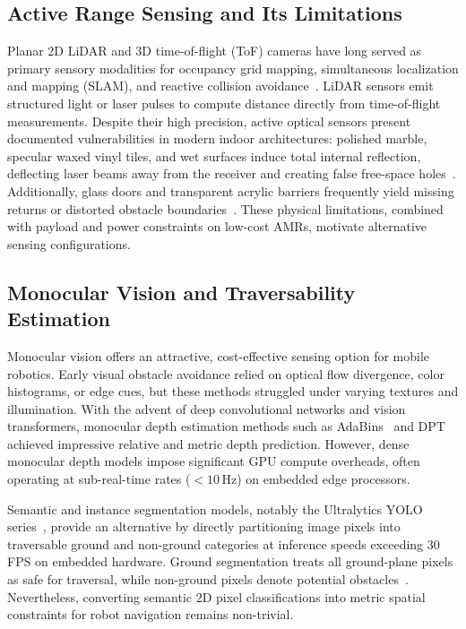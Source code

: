 \documentclass{ieeeaccess}
\begin{document}
\subsection{Active Range Sensing and Its Limitations}
Planar 2D LiDAR and 3D time-of-flight (ToF) cameras have long served as primary sensory modalities for occupancy grid mapping, simultaneous localization and mapping (SLAM), and reactive collision avoidance~\cite{li_2020_lidar,thrun_2010_probabilistic,elfes_1989_using}. LiDAR sensors emit structured light or laser pulses to compute distance directly from time-of-flight measurements. Despite their high precision, active optical sensors present documented vulnerabilities in modern indoor architectures: polished marble, specular waxed vinyl tiles, and wet surfaces induce total internal reflection, deflecting laser beams away from the receiver and creating false free-space holes~\cite{deepthadamodaran_2023_experimental,yang_2011_on}. Additionally, glass doors and transparent acrylic barriers frequently yield missing returns or distorted obstacle boundaries~\cite{tibebu_2021_lidarbased,wang_2017_detecting}. These physical limitations, combined with payload and power constraints on low-cost AMRs, motivate alternative sensing configurations.

\subsection{Monocular Vision and Traversability Estimation}
Monocular vision offers an attractive, cost-effective sensing option for mobile robotics. Early visual obstacle avoidance relied on optical flow divergence, color histograms, or edge cues, but these methods struggled under varying textures and illumination. With the advent of deep convolutional networks and vision transformers, monocular depth estimation methods such as AdaBins~\cite{shariqfarooqbhat_2021_adabins} and DPT~\cite{ranftl_2021_vision} achieved impressive relative and metric depth prediction. However, dense monocular depth models impose significant GPU compute overheads, often operating at sub-real-time rates ($<10$\,Hz) on embedded edge processors.

Semantic and instance segmentation models, notably the Ultralytics YOLO series~\cite{ultralytics_2024_ultralytics}, provide an alternative by directly partitioning image pixels into traversable ground and non-ground categories at inference speeds exceeding 30\,FPS on embedded hardware. Ground segmentation treats all ground-plane pixels as safe for traversal, while non-ground pixels denote potential obstacles~\cite{wang_2021_a,dang_2023_obstacle}. Nevertheless, converting semantic 2D pixel classifications into metric spatial constraints for robot navigation remains non-trivial.
\end{document}

